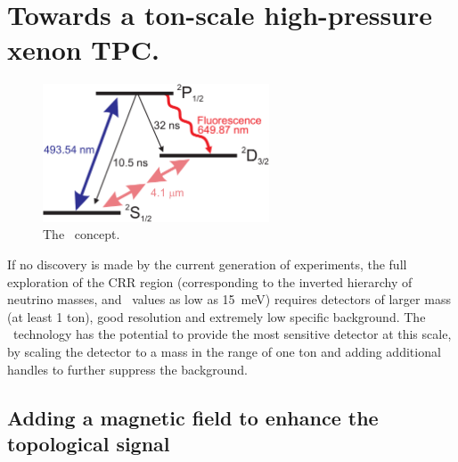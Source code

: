  
\section{Towards a ton-scale high-pressure xenon TPC.}

\begin{figure}
\centering
\includegraphics[width=0.60\textwidth]{img/levelscheme2.pdf}
\caption{\small The \BATA\ concept.} \label{fig.BATA}
\end{figure}

If no discovery is made by the current generation of experiments, the full exploration of the CRR region (corresponding to the inverted hierarchy of neutrino masses, and \mbb\ values as low as 15~meV) requires detectors of larger mass (at least 1 ton), good resolution and extremely low specific background. The \HPXE\ technology has the potential to provide the most sensitive detector at this scale, by scaling the detector to a mass in the range of one ton and adding additional handles to further suppress the background. 


\subsection{Adding a magnetic field to enhance the topological signal}

